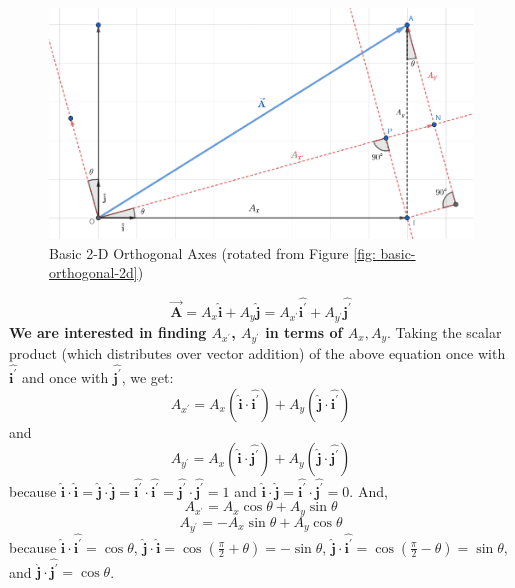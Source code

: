 \documentclass[12pt,a4paper]{book}
\newcommand{\vect}[1]{\pmb{\vec{#1}}}
\newcommand{\uvec}[1]{\pmb{\hat{#1}}}
\begin{document}
\begin{enumerate}
\begin{enumerate}
\begin{enumerate}
                \begin{figure}[h!]
                    \centering
                    \includegraphics[width=0.8\linewidth]{basic-2d-orthogonal-axes-rotated.png}
                    \caption{Basic 2-D Orthogonal Axes (rotated from Figure \ref{fig: basic-orthogonal-2d})}
                    \label{fig: basic-orthogonal-2d-rotated}
                \end{figure}
                        $$
                            \vect{A} = A_x\uvec{i} + A_y\uvec{j} = A_{x^\prime}\uvec{i^\prime} + A_{y^\prime}\uvec{j^\prime}                        
                        $$
                        \textbf{We are interested in finding $A_{x^\prime}$, $A_{y^\prime}$ in terms of $A_x, A_y$}.
                        Taking the scalar product (which distributes over vector addition) of the above equation once with $\uvec{i^\prime}$ and once with $\uvec{j^\prime}$, we get:
                        $$
                            A_{x^\prime} = A_x(\uvec{i}\cdot\uvec{i^\prime}) + A_y(\uvec{j}\cdot\uvec{i^\prime})
                        $$
                        and
                        $$
                            A_{y^\prime} = A_x(\uvec{i}\cdot\uvec{j^\prime}) + A_y(\uvec{j}\cdot\uvec{j^\prime})
                        $$
                        because $\uvec{i}\cdot\uvec{i} = \uvec{j}\cdot\uvec{j} = \uvec{i^\prime}\cdot\uvec{i^\prime} = \uvec{j^\prime}\cdot\uvec{j^\prime} = 1$ and $\uvec{i}\cdot\uvec{j} = \uvec{i^\prime}\cdot\uvec{j^\prime} = 0$. And,
                        $$
                            A_{x^\prime} = A_x\cos\theta + A_y\sin\theta
                        $$
                        $$
                            A_{y^\prime} = -A_x\sin\theta + A_y\cos\theta
                        $$
                        because $\uvec{i}\cdot\uvec{i^\prime} = \cos\theta$, $\uvec{j}\cdot\uvec{i} = \cos(\frac{\pi}{2} + \theta) = -\sin\theta$, $\uvec{j}\cdot\uvec{i^\prime} = \cos(\frac{\pi}{2}-\theta) = \sin\theta$, and $\uvec{j}\cdot\uvec{j^\prime} = \cos\theta$.


\end{enumerate}
\end{enumerate}
\end{enumerate}
\end{document}
